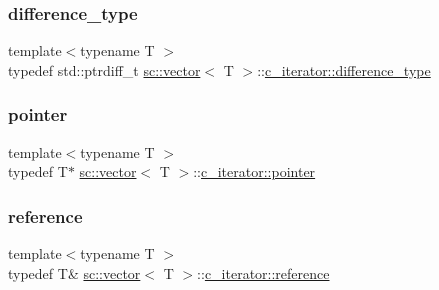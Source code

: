 \subsubsection{\texorpdfstring{difference\+\_\+type}{difference\_type}}
{\footnotesize\ttfamily template$<$typename T $>$ \\
typedef std\+::ptrdiff\+\_\+t \hyperlink{classsc_1_1vector}{sc\+::vector}$<$ T $>$\+::\hyperlink{classsc_1_1vector_1_1c__iterator_ad00b7c971e9e1ee7b9f3954d8df9b0d6}{c\+\_\+iterator\+::difference\+\_\+type}}

\mbox{\label{classsc_1_1vector_1_1c__iterator_a22d0479c5e0aa9433114c50122ff8a20}} 
\subsubsection{\texorpdfstring{pointer}{pointer}}
{\footnotesize\ttfamily template$<$typename T $>$ \\
typedef T$\ast$ \hyperlink{classsc_1_1vector}{sc\+::vector}$<$ T $>$\+::\hyperlink{classsc_1_1vector_1_1c__iterator_a22d0479c5e0aa9433114c50122ff8a20}{c\+\_\+iterator\+::pointer}}

\mbox{\label{classsc_1_1vector_1_1c__iterator_a562cdec5275111586d672e9ac3f22b4a}} 
\subsubsection{\texorpdfstring{reference}{reference}}
{\footnotesize\ttfamily template$<$typename T $>$ \\
typedef T\& \hyperlink{classsc_1_1vector}{sc\+::vector}$<$ T $>$\+::\hyperlink{classsc_1_1vector_1_1c__iterator_a562cdec5275111586d672e9ac3f22b4a}{c\+\_\+iterator\+::reference}}

\mbox{\label{classsc_1_1vector_1_1c__iterator_a0782c02315d2d1a91a491f8e5347c228}} 
